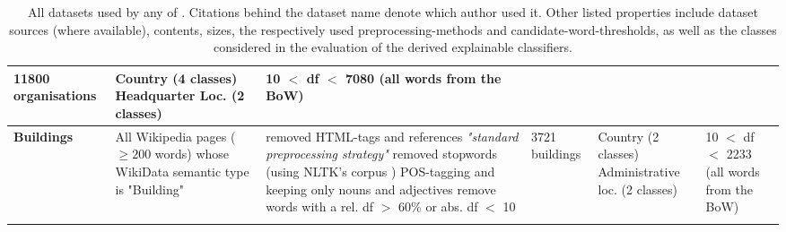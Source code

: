 \begin{landscape}
\begin{table}[]
{\begin{tabular}{@{}llllll@{}}
        		11800 organisations &
        		\specialcell[l]{ \tabitem Country (4 classes)\\ \tabitem Headquarter Loc. (2 classes)} &
        		\specialcell[l]{ 10 $<$ \acrshort{df} $<$ 7080 \\ (all words from the BoW)} \\ \midrule
        	\textbf{Buildings\footnoteref{fnote:for_alshaikh2019} \cite{Alshaikh2020}} &
        		\specialcell[l]{All Wikipedia pages ($\geq 200$ words) whose \\ WikiData semantic type is "Building"} &
        		\specialcell[l]{ \tabitem removed HTML-tags and references \\ \tabitem \textit{"standard preprocessing strategy"} \cite[137]{Alshaikh2019} \\ \tabitem removed stopwords (using NLTK's corpus \cite{loper-bird-2002-nltk})\\ \tabitem POS-tagging and keeping only nouns and adjectives \\ \tabitem remove words with a rel. \acrshort{df}  $>$ 60\% or abs. \acrshort{df} $<$ 10 } &
        		3721 buildings &
        		\specialcell[l]{ \tabitem Country (2 classes)\\ \tabitem Administrative loc. (2 classes)} &
        		\specialcell[l]{10 $<$ \acrshort{df} $<$ 2233 \\ (all words from the BoW) }\\ \Xhline{4\arrayrulewidth}
        		\\ 
		\end{tabular}
		\caption[All datasets used by any of \mainalgos]{All datasets used by any of \mainalgos. Citations behind the dataset name denote which author used it. Other listed properties include dataset sources (where available), contents, sizes, the respectively used preprocessing-methods and candidate-word-thresholds, as well as the classes considered in the evaluation of the derived explainable classifiers.}
		\label{tab:all_datasets}
	}
	\end{table}
\end{landscape}


\restoregeometry %


